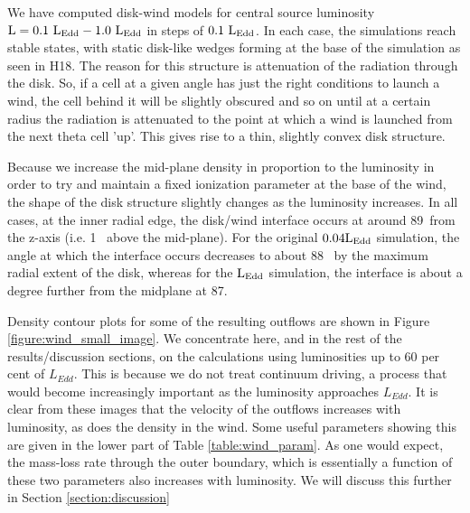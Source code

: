 \documentclass[a4paper,fleqn,usenatbib]{mnras}
\begin{document}
We have computed disk-wind models for central source luminosity 
$\rm{L=0.1~L_{Edd}-1.0~L_{Edd}}$ in steps of $\rm{0.1~L_{Edd}}$. In each case, the simulations reach stable states, 
with static disk-like wedges forming at the base of the simulation as seen in H18. The reason for this
structure is attenuation of the radiation through the disk. So, if a cell at a given angle has just the right
conditions to launch a wind, the cell behind it will be slightly obscured and so on until at a certain radius
the radiation is attenuated to the point at which a wind is launched from the next theta cell 'up'. This gives
rise to a thin, slightly convex disk structure. 

Because we increase the mid-plane density in proportion to the luminosity in order to try and maintain 
a fixed ionization parameter at the base of the wind, the shape of the disk structure slightly changes as
the luminosity increases. In all cases, at the inner radial edge, the disk/wind interface occurs at 
around 89\degree~from the z-axis (i.e. 1\degree~ above the mid-plane). For the original $\rm{0.04L_{Edd}}$ 
simulation, the angle at which the interface occurs decreases to about 88\degree~ by the maximum radial
extent of the disk, whereas for the $\rm{L_{Edd}}$ simulation, the interface is about a degree further from the
midplane at 87\degree.


Density contour plots for some of the resulting outflows are shown in Figure \ref{figure:wind_small_image}.
We concentrate here, and in the rest of the results/discussion sections, on the calculations using luminosities
up to 60 per cent of $L_{Edd}$. This is because we do not treat continuum driving, a process
that would become increasingly important as the luminosity approaches $L_{Edd}$.
It is clear from these images that the velocity of the outflows increases with luminosity, as does the 
density in the wind. Some useful parameters showing this are given in the lower part of Table \ref{table:wind_param}.
As one would expect, the mass-loss rate through the outer boundary, which is essentially a function of these 
two parameters also increases with luminosity. We will discuss this further in Section \ref{section:discussion}
\end{document}
